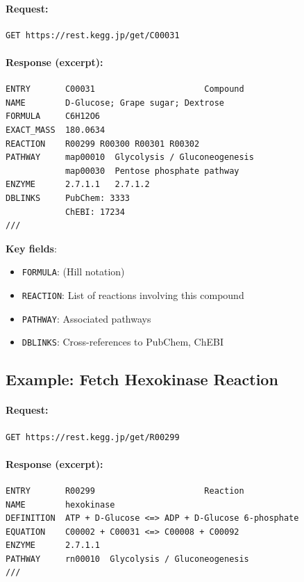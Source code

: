 \paragraph{Request:}
\begin{verbatim}
GET https://rest.kegg.jp/get/C00031
\end{verbatim}

\paragraph{Response (excerpt):}
\begin{verbatim}
ENTRY       C00031                      Compound
NAME        D-Glucose; Grape sugar; Dextrose
FORMULA     C6H12O6
EXACT_MASS  180.0634
REACTION    R00299 R00300 R00301 R00302
PATHWAY     map00010  Glycolysis / Gluconeogenesis
            map00030  Pentose phosphate pathway
ENZYME      2.7.1.1   2.7.1.2
DBLINKS     PubChem: 3333
            ChEBI: 17234
///
\end{verbatim}

\textbf{Key fields}:

\begin{itemize}
    \item \texttt{FORMULA}:  (Hill notation)
    \item \texttt{REACTION}: List of reactions involving this compound
    \item \texttt{PATHWAY}: Associated pathways
    \item \texttt{DBLINKS}: Cross-references to PubChem, ChEBI
\end{itemize}

\subsection{Example: Fetch Hexokinase Reaction}
\label{subsec:kegg-example-hexokinase}

\paragraph{Request:}
\begin{verbatim}
GET https://rest.kegg.jp/get/R00299
\end{verbatim}

\paragraph{Response (excerpt):}
\begin{verbatim}
ENTRY       R00299                      Reaction
NAME        hexokinase
DEFINITION  ATP + D-Glucose <=> ADP + D-Glucose 6-phosphate
EQUATION    C00002 + C00031 <=> C00008 + C00092
ENZYME      2.7.1.1
PATHWAY     rn00010  Glycolysis / Gluconeogenesis
///
\end{verbatim}

